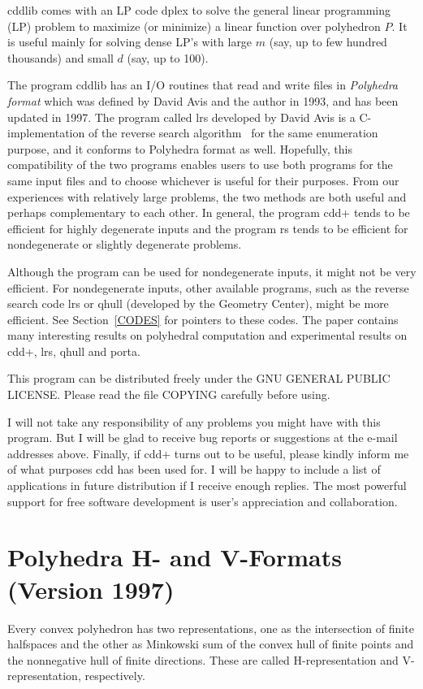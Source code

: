\documentclass[11pt]{article}
\begin{document}
cddlib comes with an LP code dplex to solve the general
linear programming (LP) problem to maximize (or minimize) a linear
function over polyhedron $P$.   It is useful mainly for solving 
dense LP's with large $m$ (say, up to few hundred thousands) and small $d$ 
(say, up to 100).

The program cddlib has an I/O routines that read and write files in 
{\em Polyhedra format\/} which was defined by David Avis and
the author in 1993, and has been updated in 1997.  
The program called lrs \cite{a-uglrs-97} developed by David Avis is
a C-implementation of the reverse search algorithm~\cite{af-pachv-92} 
for the same enumeration purpose, and it conforms to Polyhedra format as well.
Hopefully, this compatibility of the two programs
enables users to use both programs for the same input files
and to choose whichever is useful for their purposes.
From our experiences with relatively large problems,
the two methods are both useful and perhaps complementary
to each other.  In general, the program cdd+ tends to be
efficient for highly degenerate inputs and the program rs
tends to be efficient for nondegenerate or slightly
degenerate problems.

Although the program can be used for nondegenerate inputs,
it might not be very efficient.  For nondegenerate inputs, 
other available programs, such as the reverse search code lrs or
qhull (developed by the Geometry Center),
might be more efficient.  See Section~\ref{CODES} 
for pointers to these codes.  
The paper \cite{abs-hgach-97} contains many interesting results on polyhedral
computation and experimental results on cdd+, lrs, qhull and porta.

This program can be distributed freely under the GNU GENERAL PUBLIC LICENSE.
Please read the file COPYING carefully before using.

I will not take any responsibility of any problems you might have
with this program.  But I will be glad to receive bug reports or suggestions
at the e-mail addresses above.  Finally, if cdd+ turns out to be useful, 
please kindly inform  me of  what purposes cdd has been used for. 
I will be happy to include a list of applications in future
distribution  if I receive  enough replies.
The most powerful support for free software development
is user's appreciation and collaboration.

\section{Polyhedra H- and V-Formats (Version 1997)} \label{FORMAT}
\bigskip
Every convex polyhedron has two representations, one as
the intersection of finite halfspaces and the other
as Minkowski sum of the convex hull of finite points
and the nonnegative hull of finite directions.  These are
called H-representation and V-representation, respectively.
\end{document}
